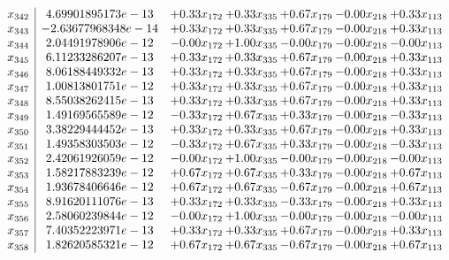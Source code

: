\documentclass[8pt]{article}
\begin{document}
\[\begin{array}{c| c c@{\hskip 2pt} c@{\hskip 2pt} c@{\hskip 2pt} c@{\hskip 2pt} c@{\hskip 2pt} }
 x_{342}   &  4.69901895173e-13 & +  0.33 x_{172} & +  0.33 x_{335} & +  0.67 x_{179} & -0.00 x_{218} & +  0.33 x_{113}\\
 x_{343}   &  -2.63677968348e-14 & +  0.33 x_{172} & +  0.33 x_{335} & +  0.67 x_{179} & -0.00 x_{218} & +  0.33 x_{113}\\
 x_{344}   &  2.04491978906e-12 & -0.00 x_{172} & +  1.00 x_{335} & -0.00 x_{179} & -0.00 x_{218} & -0.00 x_{113}\\
 x_{345}   &  6.11233286207e-13 & +  0.33 x_{172} & +  0.33 x_{335} & +  0.67 x_{179} & -0.00 x_{218} & +  0.33 x_{113}\\
 x_{346}   &  8.06188449332e-13 & +  0.33 x_{172} & +  0.33 x_{335} & +  0.67 x_{179} & -0.00 x_{218} & +  0.33 x_{113}\\
 x_{347}   &  1.00813801751e-12 & +  0.33 x_{172} & +  0.33 x_{335} & +  0.67 x_{179} & -0.00 x_{218} & +  0.33 x_{113}\\
 x_{348}   &  8.55038262415e-13 & +  0.33 x_{172} & +  0.33 x_{335} & +  0.67 x_{179} & -0.00 x_{218} & +  0.33 x_{113}\\
 x_{349}   &  1.49169565589e-12 & -0.33 x_{172} & +  0.67 x_{335} & +  0.33 x_{179} & -0.00 x_{218} & -0.33 x_{113}\\
 x_{350}   &  3.38229444452e-13 & +  0.33 x_{172} & +  0.33 x_{335} & +  0.67 x_{179} & -0.00 x_{218} & +  0.33 x_{113}\\
 x_{351}   &  1.49358303503e-12 & -0.33 x_{172} & +  0.67 x_{335} & +  0.33 x_{179} & -0.00 x_{218} & -0.33 x_{113}\\
 x_{352}   &  2.42061926059e-12 & -0.00 x_{172} & +  1.00 x_{335} & -0.00 x_{179} & -0.00 x_{218} & -0.00 x_{113}\\
 x_{353}   &  1.58217883239e-12 & +  0.67 x_{172} & +  0.67 x_{335} & +  0.33 x_{179} & -0.00 x_{218} & +  0.67 x_{113}\\
 x_{354}   &  1.93678406646e-12 & +  0.67 x_{172} & +  0.67 x_{335} & -0.67 x_{179} & -0.00 x_{218} & +  0.67 x_{113}\\
 x_{355}   &  8.91620111076e-13 & +  0.33 x_{172} & +  0.33 x_{335} & -0.33 x_{179} & -0.00 x_{218} & +  0.33 x_{113}\\
 x_{356}   &  2.58060239844e-12 & -0.00 x_{172} & +  1.00 x_{335} & -0.00 x_{179} & -0.00 x_{218} & -0.00 x_{113}\\
 x_{357}   &  7.40352223971e-13 & +  0.33 x_{172} & +  0.33 x_{335} & +  0.67 x_{179} & -0.00 x_{218} & +  0.33 x_{113}\\
 x_{358}   &  1.82620585321e-12 & +  0.67 x_{172} & +  0.67 x_{335} & -0.67 x_{179} & -0.00 x_{218} & +  0.67 x_{113}\\

\end{array}\]
\end{document}
